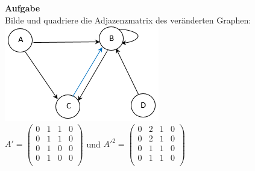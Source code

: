 \begin{frame}
	\textbf{Aufgabe}\\
	Bilde und quadriere die Adjazenzmatrix des veränderten Graphen:\\
	\includegraphics[scale=0.6]{images/Graph2_edit.png}\\
	\pause
	$ A' =
	\begin{pmatrix}
	0&1&1&0\\
	0&1&1&0\\
	0&1&0&0\\
	0&1&0&0\\
	\end{pmatrix}	
	$ 
	und 
	$ A'^2 =
	\begin{pmatrix}
	0&2&1&0\\
	0&2&1&0\\
	0&1&1&0\\
	0&1&1&0\\
	\end{pmatrix}	
	$
\end{frame}

